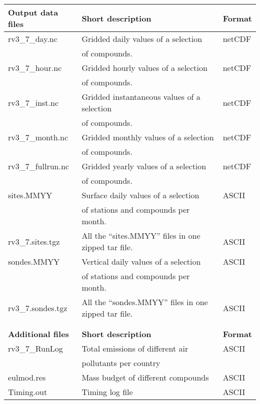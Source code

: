 \begin{table}
\hspace{-1cm}
\begin{tabular}{lll}
\hline\hline
{\bf Output data files} &  {\bf Short description} & {\bf Format}\\
\hline\hline
    rv3\_7\_day.nc & Gridded daily values of a selection & netCDF\\
&   of compounds.& \\ 
    rv3\_7\_hour.nc &Gridded hourly values of a selection &
    netCDF\\  
 &  of compounds.& \\
    rv3\_7\_inst.nc &Gridded instantaneous values of a selection
     & netCDF\\
 &  of compounds.& \\
    rv3\_7\_month.nc & Gridded monthly values of a selection&
    netCDF\\
 &  of compounds.& \\
    rv3\_7\_fullrun.nc & Gridded yearly values of a selection&
    netCDF\\
 &  of compounds. & \\
    sites.MMYY & Surface daily values of a selection&  ASCII\\
 & of stations and compounds per month.& \\
    rv3\_7.sites.tgz & All the ``sites.MMYY'' files in one zipped tar file. & ASCII\\\hline
    sondes.MMYY & Vertical daily values of a selection& ASCII\\
 &  of stations and compounds per month.& \\
    rv3\_7.sondes.tgz& All the ``sondes.MMYY'' files in one zipped tar file.&
    ASCII\\ 
& &\\ 
& &\\ \hline\hline
{\bf Additional files} &  {\bf Short description} & {\bf Format}\\
\hline\hline
    rv3\_7\_RunLog & Total emissions of different air   & ASCII\\
 & pollutants per country& \\
eulmod.res & Mass budget of different compounds & ASCII\\
Timing.out & Timing log file& ASCII \\
 
\hline
\end{tabular}

\label{Tab:outputs}
\end{table}



